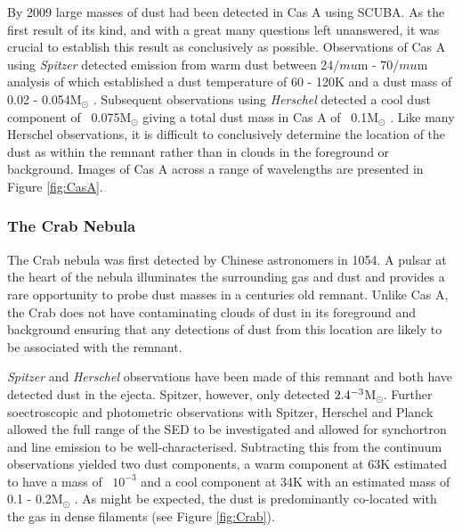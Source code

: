 By 2009 large masses of dust had been detected in Cas A using SCUBA.  As the first result of its kind, and with a great many questions left unanswered, it was crucial to establish this result as conclusively as possible.   Observations of Cas A using \textit{Spitzer} detected emission from warm dust between 24$/mu$m - 70$/mu$m analysis of which established a dust temperature of 60 - 120K and a dust mass of 0.02 - 0.054M$_{\odot}$ \citep{Rho2008}.  Subsequent observations using \textit{Herschel} detected a cool dust component of ~0.075M$_{\odot}$ giving a total dust mass in Cas A of ~0.1M$_{\odot}$ \citep{Barlow2010}.  Like many Herschel observations, it is difficult to conclusively determine the location of the dust as within the remnant rather than in clouds in the foreground or background.  Images of Cas A across a range of wavelengths are presented in Figure \ref{fig:CasA}.  

\subsubsection{The Crab Nebula}

The Crab nebula was first detected by Chinese astronomers in 1054.  A pulsar at the heart of the nebula illuminates the surrounding gas and dust and provides a rare opportunity to probe dust masses in a centuries old remnant.  Unlike Cas A, the Crab does not have contaminating clouds of dust in its foreground and background ensuring that any detections of dust from this location are likely to be associated with the remnant.
 
\textit{Spitzer} and \textit{Herschel} observations have been made of this remnant and both have detected dust in the ejecta.  Spitzer, however, only detected $2.4\time10^{-3}$M$_{\odot}$.  Further soectroscopic and photometric observations with Spitzer, Herschel and Planck allowed the full range of the SED to be investigated and allowed for synchortron and line emission to be well-characterised.  Subtracting this from the continuum observations yielded two dust components, a warm component at 63K estimated to have a mass of ~$10^{-3}$ and a cool component at  34K with an estimated mass of 0.1 - 0.2M$_{\odot}$ \citep{Gomez2012,Temim2012}.  As might be expected, the dust is predominantly co-located with the gas in dense filaments (see Figure \ref{fig:Crab}).
 
